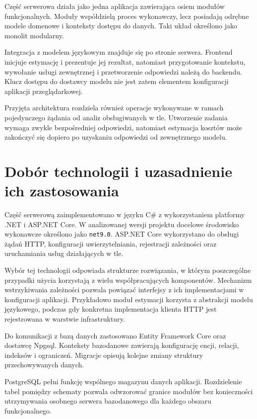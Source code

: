 Część serwerowa działa jako jedna aplikacja zawierająca osiem modułów funkcjonalnych. Moduły współdzielą proces wykonawczy, lecz posiadają odrębne modele domenowe i konteksty dostępu do danych. Taki układ określono jako monolit modularny.

Integracja z modelem językowym znajduje się po stronie serwera. Frontend inicjuje estymację i prezentuje jej rezultat, natomiast przygotowanie kontekstu, wywołanie usługi zewnętrznej i przetworzenie odpowiedzi należą do backendu. Klucz dostępu do dostawcy modelu nie jest zatem elementem konfiguracji aplikacji przeglądarkowej.

Przyjęta architektura rozdziela również operacje wykonywane w ramach pojedynczego żądania od analiz obsługiwanych w tle. Utworzenie zadania wymaga zwykle bezpośredniej odpowiedzi, natomiast estymacja kosztów może zakończyć się dopiero po uzyskaniu odpowiedzi od zewnętrznego modelu.

\section{Dobór technologii i uzasadnienie ich zastosowania}

Część serwerową zaimplementowano w języku C\# z wykorzystaniem platformy .NET i ASP.NET Core. W analizowanej wersji projektu docelowe środowisko wykonawcze określono jako \texttt{net9.0}. ASP.NET Core wykorzystano do obsługi żądań HTTP, konfiguracji uwierzytelniania, rejestracji zależności oraz uruchamiania usług działających w tle.

Wybór tej technologii odpowiada strukturze rozwiązania, w którym poszczególne przypadki użycia korzystają z wielu współpracujących komponentów. Mechanizm wstrzykiwania zależności pozwala powiązać interfejsy z ich implementacjami w konfiguracji aplikacji. Przykładowo moduł estymacji korzysta z abstrakcji modelu językowego, podczas gdy konkretna implementacja klienta HTTP jest rejestrowana w warstwie infrastruktury.

Do komunikacji z bazą danych zastosowano Entity Framework Core oraz dostawcę Npgsql. Konteksty bazodanowe zawierają konfigurację encji, relacji, indeksów i ograniczeń. Migracje opisują kolejne zmiany struktury przechowywanych danych.

PostgreSQL pełni funkcję wspólnego magazynu danych aplikacji. Rozdzielenie tabel pomiędzy schematy pozwala odwzorować granice modułów bez konieczności utrzymywania osobnego serwera bazodanowego dla każdego obszaru funkcjonalnego.

